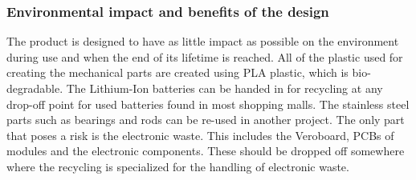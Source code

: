 \subsubsection{Environmental impact and benefits of the design}
The product is designed to have as little impact as possible on the environment during use and when the end of its lifetime is reached. All of the plastic used for creating the mechanical parts are created using PLA plastic, which is bio-degradable. The Lithium-Ion batteries can be handed in for recycling at any drop-off point for used batteries found in most shopping malls. The stainless steel parts such as bearings and rods can be re-used in another project. The only part that poses a risk is the electronic waste. This includes the Veroboard, PCBs of modules and the electronic components. These should be dropped off somewhere where the recycling is specialized for the handling of electronic waste.